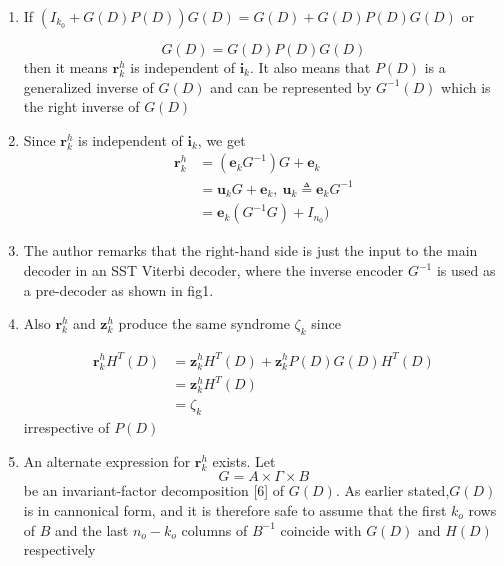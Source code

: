 \documentclass[fontsize=12pt]{article}
\theoremstyle{definition}
\begin{document}
\begin{enumerate}
\item If $\left(I_{k_{0}}+G(D) P(D)\right) G(D) = G(D)+G(D) P(D)G(D) $ or 

\begin{equation}
G(D)=G(D) P(D)G(D) 
\end{equation}
then it means $\mathbf{r}^h_k$ is independent of $\mathbf{i}_k$. It also means that $P(D)$ is a generalized inverse of $G(D)$ and can be represented by $G^{-1}(D)$ which is the right inverse of $G(D)$

\item Since $\mathbf{r}^h_k$ is independent of $\mathbf{i}_k$, we get 
\begin{equation}
\begin{aligned}
\mathbf{r}_{k}^{h} &=(\mathbf{e}_kG^{-1}) G +\mathbf{e}_k\\
&=\mathbf{u}_kG + \mathbf{e}_k,~\mathbf{u}_k \triangleq \mathbf{e}_kG^{-1}\\
&=\mathbf{e}_k(G^{-1}G )+ I_{n_0})
\end{aligned}
\end{equation}

\item The author remarks that the
right-hand side is just the input to the main decoder in an
SST Viterbi decoder, where the inverse encoder $G^{-1}$ is used
as a pre-decoder as shown in fig1.

\item Also $\mathbf{r}_k^h$ and $\mathbf{z}_k^h$ produce the same syndrome $\zeta_{k}$ since 

\begin{equation}
\begin{aligned}
\mathbf{r}_{k}^{h} H^{T}(D)&=\mathbf{z}_{k}^{h}H^{T}(D)+\mathbf{z}_{k}^{h} P(D) G(D)H^{T}(D) \\
&= \mathbf{z}_{k}^{h}H^{T}(D)\\
&=\zeta_{k}
\end{aligned}
\end{equation}
irrespective of $P(D)$

\item An alternate expression for $\mathbf{r}^h_k$ exists. Let 
\begin{equation}
G = A \times \Gamma \times B
\end{equation}
be an invariant-factor decomposition [6] of $G(D)$. As earlier stated,$G(D)$ is in cannonical form, and it is therefore safe to assume that the first $k_o$ rows of $B$ and the last $n_o-k_o$ columns of $B^{-1}$ coincide with  $G(D)$ and $H(D)$ respectively


\end{enumerate}
\end{document}
